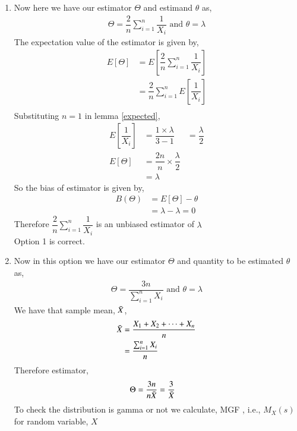 \documentclass[journal,12pt,twocolumn]{IEEEtran}
\theoremstyle{definition}
\begin{document}
\begin{enumerate}
    \item 
  Now here we have our estimator $ \Theta$ and estimand $ \theta $ as,
 \begin{align}
     \Theta = \dfrac{2}{n} \sum_{i=1}^{n} \dfrac{1}{X_i} \text{  and  }
     \theta = \lambda
 \end{align}
The expectation value of the estimator is given by, 
\begin{align}
    E[\Theta ] &= E  \left[   \dfrac{2}{n} \sum_{i=1}^{n} \dfrac{1}{X_i}  \right] \\
    & = \dfrac{2}{n} \sum_{i=1}^{n} E  \left[ \dfrac{1}{X_i}  \right] \\
 \end{align}
 Substituting $ n=1 $ in lemma \ref{expected},
 \begin{align}
   E \left[  \dfrac{1}{X_i}  \right] &= \dfrac{1 \times\lambda}{3-1}
  &= \dfrac{\lambda}{2} \\
 E[\Theta]     &= \dfrac{2n}{n} \times \dfrac{\lambda}{2} \\
              &= \lambda
\end{align}
So the bias of estimator is given by,
\begin{align}
    B(\Theta) &= E[\Theta] - \theta  \\
    &= \lambda - \lambda = 0
\end{align}
Therefore $\dfrac{2}{n} \sum_{i=1}^{n} \dfrac{1}{X_i} $ is an unbiased estimator of $ \lambda$ \\
Option 1 is correct. \\
\item
 Now in this option we have our estimator $ \Theta$ and quantity to be estimated $ \theta $ as,
 \begin{align}
     \Theta = \dfrac{3n}{\sum_{i=1}^{n} X_i } \text{  and  }
     \theta = \lambda
 \end{align}
We have that sample mean, $ \Bar{X}$,
\begin{align}
    \Bar{X} &= \dfrac{X_1+X_2+ \cdots +X_n}{n} \\
    & = \dfrac{\sum_{i=1}^{n} X_i}{n}
\end{align}
Therefore estimator,
\begin{align}
    \Theta &= \dfrac{3n}{n \Bar{X}} 
    = \dfrac{3}{ \Bar{X}} 
    \label{xbar}
\end{align}
To check the distribution is gamma or not we calculate, MGF , i.e., $ M_X(s) $ for random variable, $ X $


\end{enumerate}
\end{document}
